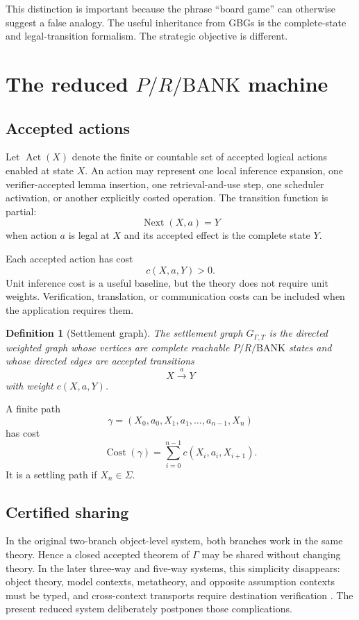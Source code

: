 \documentclass[11pt]{article}
\newtheorem{definition}{Definition}[section]
\theoremstyle{remark}
\newcommand{\BANK}{\ensuremath{\mathrm{BANK}}}
\newcommand{\Cost}{\operatorname{Cost}}
\newcommand{\Act}{\operatorname{Act}}
\newcommand{\Next}{\operatorname{Next}}
\begin{document}
This distinction is important because the phrase ``board game'' can otherwise suggest a false analogy. The useful inheritance from GBGs is the complete-state and legal-transition formalism. The strategic objective is different.

\section{The reduced \texorpdfstring{$P/R/\BANK$}{P/R/BANK} machine}

\subsection{Accepted actions}

Let $\Act(X)$ denote the finite or countable set of accepted logical actions enabled at state $X$. An action may represent one local inference expansion, one verifier-accepted lemma insertion, one retrieval-and-use step, one scheduler activation, or another explicitly costed operation. The transition function is partial:
\[
\Next(X,a)=Y
\]
when action $a$ is legal at $X$ and its accepted effect is the complete state $Y$.

Each accepted action has cost
\[
c(X,a,Y)>0.
\]
Unit inference cost is a useful baseline, but the theory does not require unit weights. Verification, translation, or communication costs can be included when the application requires them.

\begin{definition}[Settlement graph]
The settlement graph $G_{\Gamma,T}$ is the directed weighted graph whose vertices are complete reachable $P/R/\BANK$ states and whose directed edges are accepted transitions
\[
X\xrightarrow{a}Y
\]
with weight $c(X,a,Y)$.
\end{definition}

A finite path
\[
\gamma=(X_0,a_0,X_1,a_1,\ldots,a_{n-1},X_n)
\]
has cost
\[
\Cost(\gamma)=\sum_{i=0}^{n-1}c(X_i,a_i,X_{i+1}).
\]
It is a settling path if $X_n\in\Sigma$.

\subsection{Certified sharing}

In the original two-branch object-level system, both branches work in the same theory. Hence a closed accepted theorem of $\Gamma$ may be shared without changing theory. In the later three-way and five-way systems, this simplicity disappears: object theory, model contexts, metatheory, and opposite assumption contexts must be typed, and cross-context transports require destination verification \cite{TennesonCSII}. The present reduced system deliberately postpones those complications.
\end{document}
